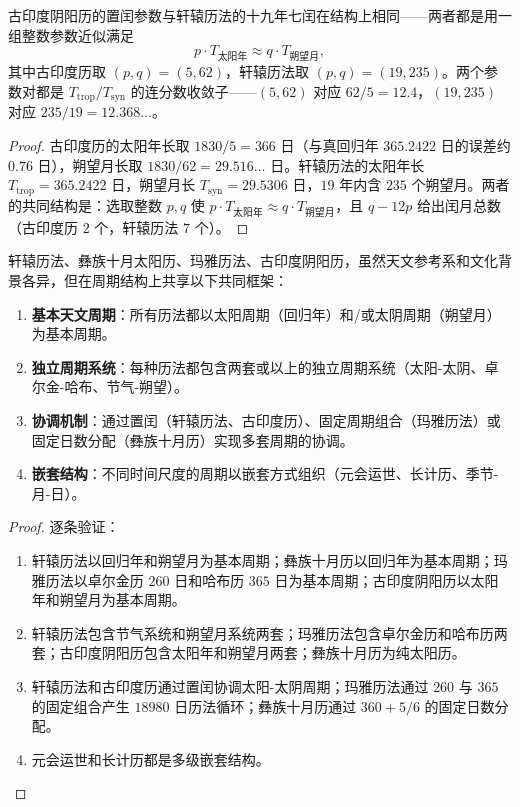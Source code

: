 \begin{proposition}[古印度阴阳历的置闰参数]\label{prop:indian_calendar_intercalation}
古印度阴阳历的置闰参数与轩辕历法的十九年七闰在结构上相同——两者都是用一组整数参数近似满足
\[
p\cdot T_{\text{太阳年}}\approx q\cdot T_{\text{朔望月}},
\]
其中古印度历取 \((p,q)=(5,62)\)，轩辕历法取 \((p,q)=(19,235)\)。两个参数对都是 \(T_{\text{trop}}/T_{\text{syn}}\) 的连分数收敛子——\((5,62)\) 对应 \(62/5=12.4\)，\((19,235)\) 对应 \(235/19=12.368\ldots\)。
\end{proposition}

\begin{proof}
古印度历的太阳年长取 \(1830/5=366\) 日（与真回归年 \(365.2422\) 日的误差约 \(0.76\) 日），朔望月长取 \(1830/62=29.516\ldots\) 日。轩辕历法的太阳年长 \(T_{\text{trop}}=365.2422\) 日，朔望月长 \(T_{\text{syn}}=29.5306\) 日，\(19\) 年内含 \(235\) 个朔望月。两者的共同结构是：选取整数 \(p,q\) 使 \(p\cdot T_{\text{太阳年}}\approx q\cdot T_{\text{朔望月}}\)，且 \(q-12p\) 给出闰月总数（古印度历 \(2\) 个，轩辕历法 \(7\) 个）。
\end{proof}

\begin{theorem}[世界主要历法的周期结构统一框架]\label{thm:world_calendar_unification}
轩辕历法、彝族十月太阳历、玛雅历法、古印度阴阳历，虽然天文参考系和文化背景各异，但在周期结构上共享以下共同框架：
\begin{enumerate}[label=(\roman*)]
    \item \textbf{基本天文周期}：所有历法都以太阳周期（回归年）和/或太阴周期（朔望月）为基本周期。
    \item \textbf{独立周期系统}：每种历法都包含两套或以上的独立周期系统（太阳-太阴、卓尔金-哈布、节气-朔望）。
    \item \textbf{协调机制}：通过置闰（轩辕历法、古印度历）、固定周期组合（玛雅历法）或固定日数分配（彝族十月历）实现多套周期的协调。
    \item \textbf{嵌套结构}：不同时间尺度的周期以嵌套方式组织（元会运世、长计历、季节-月-日）。
\end{enumerate}
\end{theorem}

\begin{proof}
逐条验证：
\begin{enumerate}[label=(\roman*)]
\item 轩辕历法以回归年和朔望月为基本周期；彝族十月历以回归年为基本周期；玛雅历法以卓尔金历 \(260\) 日和哈布历 \(365\) 日为基本周期；古印度阴阳历以太阳年和朔望月为基本周期。
\item 轩辕历法包含节气系统和朔望月系统两套；玛雅历法包含卓尔金历和哈布历两套；古印度阴阳历包含太阳年和朔望月两套；彝族十月历为纯太阳历。
\item 轩辕历法和古印度历通过置闰协调太阳-太阴周期；玛雅历法通过 \(260\) 与 \(365\) 的固定组合产生 \(18980\) 日历法循环；彝族十月历通过 \(360+5/6\) 的固定日数分配。
\item 元会运世和长计历都是多级嵌套结构。
\end{enumerate}
\end{proof}

